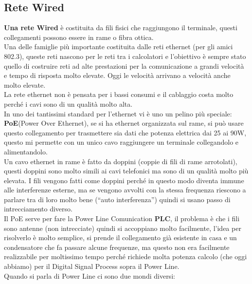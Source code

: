 \documentclass[11pt, twocolumn]{article}
\begin{document}
\subsection{Rete Wired}
\textbf{Una rete Wired} è costituita da fili fisici che raggiungono il terminale, questi collegamenti possono essere in rame o fibra ottica.\\
Una delle famiglie più importante costituita dalle reti ethernet (per gli amici 802.3), queste reti nascono per le reti tra i calcolatori e l'obiettivo è sempre stato quello di costruire reti ad alte prestazioni per la comunicazione a grandi velocità e tempo di risposta molto elevate.
Oggi le velocità arrivano a velocità anche molto elevate.\\
La rete ethernet non è pensata per i bassi consumi e il cablaggio costa molto perché i cavi sono di un qualità molto alta.\\
In uno dei tantissimi standard per l'ethernet vi è uno un pelino più speciale: \textbf{PoE}(Power Over Ethernet), se si ha ethernet organizzata sul rame, si può usare questo collegamento per trasmettere sia dati che potenza elettrica dai 25 ai 90W, questo mi permette con un unico cavo raggiungere un terminale collegandolo e alimentandolo.\\
Un cavo ethernet in rame è fatto da doppini (coppie di fili di rame arrotolati), questi doppini sono molto simili ai cavi telefonici ma sono di un qualità molto più elevata.
I fili vengono fatti come doppini perché in questo modo diventa immune  alle interferenze esterne, ma se vengono avvolti con la stessa frequenza riescono a parlare tra di loro molto bene (``auto interferenza'') quindi si usano passo di intrecciamento diverso.\\
Il PoE serve per fare la Power Line Comunication \textbf{PLC}, il problema è che i fili sono antenne (non intrecciate) quindi si accoppiano molto facilmente, l'idea per risolverlo è molto semplice, si prende il collegamento già esistente in casa e un condensatore che fa passare alcune frequenze, ma questo non era facilmente realizzabile per moltissimo tempo perché richiede molta potenza calcolo (che oggi abbiamo) per il Digital Signal Process sopra il Power Line.\\
Quando si parla di Power Line ci sono due mondi diversi:
\end{document}
